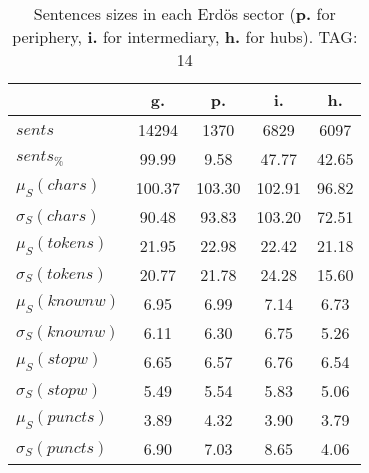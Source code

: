 \begin{table}[h!]
\begin{center}
\begin{tabular}{| l || c | c | c | c |}\hline
 & {\bf g.} & {\bf p.} & {\bf i.} & {\bf h.} \\\hline\hline
$sents$ & 14294  & 1370  & 6829  & 6097 \\
$sents_{\%}$ & 99.99  & 9.58  & 47.77  & 42.65 \\\hline
$\mu_S(chars)$ & 100.37  & 103.30  & 102.91  & 96.82 \\
$\sigma_S(chars)$ & 90.48  & 93.83  & 103.20  & 72.51 \\\hline
$\mu_S(tokens)$ & 21.95  & 22.98  & 22.42  & 21.18 \\
$\sigma_S(tokens)$ & 20.77  & 21.78  & 24.28  & 15.60 \\\hline
$\mu_S(knownw)$ & 6.95  & 6.99  & 7.14  & 6.73 \\
$\sigma_S(knownw)$ & 6.11  & 6.30  & 6.75  & 5.26 \\\hline
$\mu_S(stopw)$ & 6.65  & 6.57  & 6.76  & 6.54 \\
$\sigma_S(stopw)$ & 5.49  & 5.54  & 5.83  & 5.06 \\\hline
$\mu_S(puncts)$ & 3.89  & 4.32  & 3.90  & 3.79 \\
$\sigma_S(puncts)$ & 6.90  & 7.03  & 8.65  & 4.06 \\\hline
\end{tabular}
\caption{Sentences sizes in each Erd\"os sector ({{\bf p.}} for periphery, {{\bf i.}} for intermediary, {{\bf h.}} for hubs). TAG: 14}
\end{center}
\end{table}